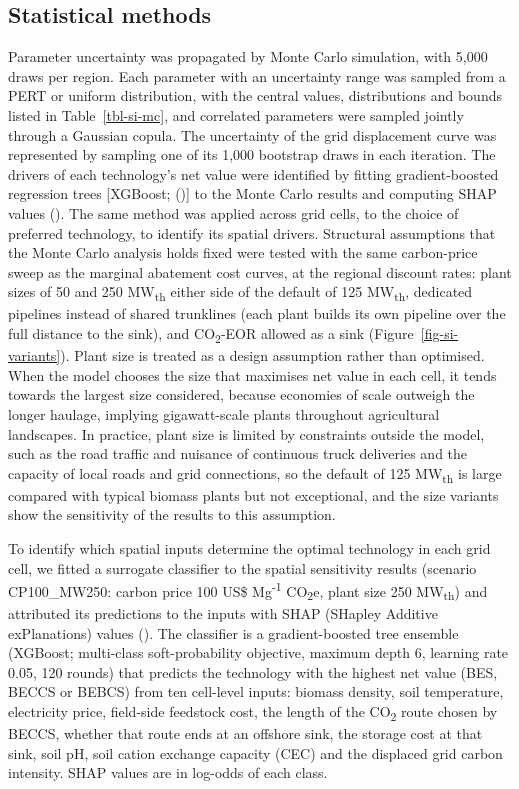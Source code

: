 \documentclass[
  letterpaper,
]{article}
\begin{document}
\subsection{Statistical methods}\label{statistical-methods}

Parameter uncertainty was propagated by Monte Carlo simulation, with
5,000 draws per region. Each parameter with an uncertainty range was
sampled from a PERT or uniform distribution, with the central values,
distributions and bounds listed in Table~\ref{tbl-si-mc}, and correlated
parameters were sampled jointly through a Gaussian copula. The
uncertainty of the grid displacement curve was represented by sampling
one of its 1,000 bootstrap draws in each iteration. The drivers of each
technology's net value were identified by fitting gradient-boosted
regression trees {[}XGBoost;
(){]} to the Monte Carlo
results and computing SHAP values
(). The same method was applied
across grid cells, to the choice of preferred technology, to identify
its spatial drivers. Structural assumptions that the Monte Carlo
analysis holds fixed were tested with the same carbon-price sweep as the
marginal abatement cost curves, at the regional discount rates: plant
sizes of 50 and 250 MW\textsubscript{th} either side of the default of
125 MW\textsubscript{th}, dedicated pipelines instead of shared
trunklines (each plant builds its own pipeline over the full distance to
the sink), and CO\textsubscript{2}-EOR allowed as a sink
(Figure~\ref{fig-si-variants}). Plant size is treated as a design
assumption rather than optimised. When the model chooses the size that
maximises net value in each cell, it tends towards the largest size
considered, because economies of scale outweigh the longer haulage,
implying gigawatt-scale plants throughout agricultural landscapes. In
practice, plant size is limited by constraints outside the model, such
as the road traffic and nuisance of continuous truck deliveries and the
capacity of local roads and grid connections, so the default of 125
MW\textsubscript{th} is large compared with typical biomass plants but
not exceptional, and the size variants show the sensitivity of the
results to this assumption.

To identify which spatial inputs determine the optimal technology in
each grid cell, we fitted a surrogate classifier to the spatial
sensitivity results (scenario CP100\_MW250: carbon price 100 US\$
Mg\textsuperscript{-1} CO\textsubscript{2}e, plant size 250
MW\textsubscript{th}) and attributed its predictions to the inputs with
SHAP (SHapley Additive exPlanations) values
(). The classifier is a
gradient-boosted tree ensemble (XGBoost; multi-class soft-probability
objective, maximum depth 6, learning rate 0.05, 120 rounds) that
predicts the technology with the highest net value (BES, BECCS or BEBCS)
from ten cell-level inputs: biomass density, soil temperature,
electricity price, field-side feedstock cost, the length of the
CO\textsubscript{2} route chosen by BECCS, whether that route ends at an
offshore sink, the storage cost at that sink, soil pH, soil cation
exchange capacity (CEC) and the displaced grid carbon intensity. SHAP
values are in log-odds of each class.
\end{document}
